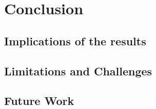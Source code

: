 %
\chapter{Conclusion}

\section{Implications of the results}

\section{Limitations and Challenges}

\section{Future Work}